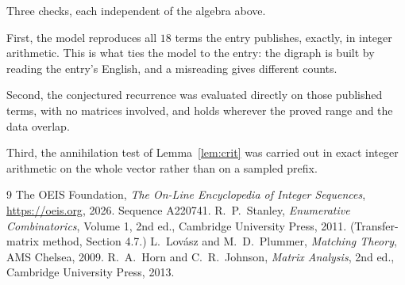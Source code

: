 \documentclass[11pt,a4paper]{article}
\theoremstyle{plain}
\theoremstyle{definition}
\begin{document}
Three checks, each independent of the algebra above.

First, the model reproduces all $18$ terms the entry publishes, exactly, in integer
arithmetic. This is what ties the model to the entry: the digraph is built by reading the
entry's English, and a misreading gives different counts.

Second, the conjectured recurrence was evaluated directly on those published terms, with no
matrices involved, and holds wherever the proved range and the data overlap.

Third, the annihilation test of Lemma~\ref{lem:crit} was carried out in exact integer
arithmetic on the whole vector rather than on a sampled prefix.

\begin{thebibliography}{9}
 The OEIS Foundation, \emph{The On-Line Encyclopedia of Integer
Sequences}, \url{https://oeis.org}, 2026. Sequence A220741.
 R.~P.~Stanley, \emph{Enumerative Combinatorics}, Volume 1, 2nd ed.,
Cambridge University Press, 2011. (Transfer-matrix method, Section 4.7.)
 L.~Lov\'asz and M.~D.~Plummer, \emph{Matching Theory}, AMS Chelsea,
2009.
 R.~A.~Horn and C.~R.~Johnson, \emph{Matrix Analysis}, 2nd ed., Cambridge
University Press, 2013.
\end{thebibliography}
\end{document}
